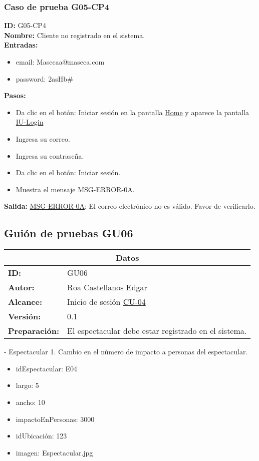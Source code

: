 \subsubsection{Caso de prueba G05-CP4}
\textbf{ID:} G05-CP4\\
\textbf{Nombre:} Cliente no registrado en el sistema.\\
\textbf{Entradas:} 
\begin{itemize}
    \item email: Masecaa@maseca.com
    \item password: 2asHb\#\\
\end{itemize}
\textbf{Pasos:}
\begin{itemize}
    \item Da clic en el botón: Iniciar sesión en la pantalla \hyperlink{IU:IU-HOME}{Home} y aparece la pantalla \hyperlink{IU:IU-Login}{IU-Login}
    \item Ingresa su correo.
    \item Ingresa su contraseña.
    \item Da clic en el botón: Iniciar sesión.
    \item Muestra el mensaje MSG-ERROR-0A.
\end{itemize}
\textbf{Salida:}
\hyperlink{MSG-ERROR-0A}{MSG-ERROR-0A}: El correo electrónico no es válido. Favor de verificarlo.
\clearpage


\subsection{Guión de pruebas GU06}
\begin{table}[htbp]
\centering
\begin{tabular}{| p{5cm}| p{13cm} |} \hline
\multicolumn{2}{|c|}{\textbf{Datos}} \\ \hline
\textbf{ID:}&GU06\\ \hline
\textbf{Autor:}&Roa Castellanos Edgar\\ \hline
\textbf{Alcance:}&Inicio de sesión \hyperlink{CU:CU04}{CU-04}\\ \hline
\textbf {Versión:}&0.1 \\ \hline
\textbf{Preparación:}&El espectacular debe estar registrado en el sistema.\\ \hline
\end{tabular}
\end{table}

- Espectacular 1. Cambio en el número de impacto a personas del espectacular. 
\begin{itemize}
    \item idEspectacular: E04
    \item largo: 5
    \item ancho: 10
    \item impactoEnPersonas: 3000
    \item idUbicación: 123
    \item imagen: Espectacular.jpg
\end{itemize}

